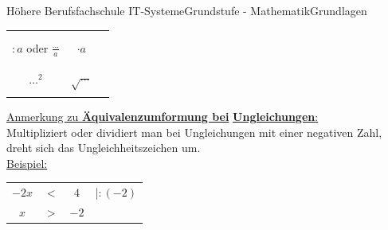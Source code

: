 \documentclass[11pt,twocolumn,oneside,openany,headings=optiontotoc,11pt,numbers=noenddot]{article}
\begin{document}
\begin{worksheet}{Höhere Berufsfachschule IT-Systeme}{Grundstufe - Mathematik}{Grundlagen}
\begin{tabularx}{0.45\textwidth}{|c|c|X|}
			\multicolumn{1}{|l|}{} & & \\
			\cline{1-2}
			\multicolumn{1}{|l|}{} & & \\
			\(:a\) oder \(\frac{\ldots}{a}\) & \(\cdot{}a\) & \\
			\multicolumn{1}{|l|}{} & & \\
			\cline{1-2}
			\multicolumn{1}{|l|}{} & & \\
			\(\ldots^2\) & \glqq{}\(\sqrt{\ldots}\)\grqq{} & \\
			\multicolumn{1}{|l|}{} & & \\
			\hline
		\end{tabularx}
		\par\bigskip\noindent
		\underline{Anmerkung zu \textbf{Äquivalenzumformung bei}} \underline{\textbf{Ungleichungen}:}\\
		Multipliziert oder dividiert man bei Ungleichungen mit einer negativen Zahl, dreht sich das Ungleichheitszeichen um.\\
		\underline{Beispiel:}
		\begin{tabularx}{0.5\textwidth}{cccl}
			\(-2x\) & \(<\) & \(4\) & |\(:(-2)\)\\
			\(x\) & \(>\) & \(-2\)
		\end{tabularx}
	\end{worksheet}
\end{document}
